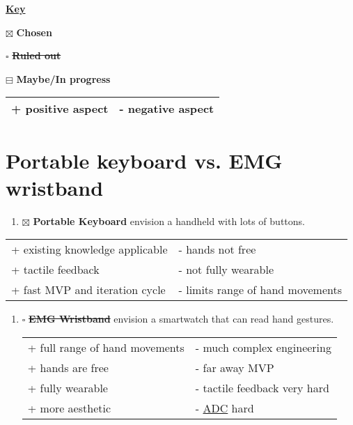\documentclass[logo,bsc,singlespacing,parskip]{infthesis}
\begin{document}
\begin{mdframed}
\uline{\textbf{Key}}
\begin{center}
\begin{enumerate*}[label={}, itemjoin={\qquad}]
\item[{$\boxtimes$}] \textbf{Chosen}
\item[{$\square$}] \sout{\textbf{Ruled out}}
\item[{$\boxminus$}] \textbf{Maybe/In progress}
\end{enumerate*}
\end{center}

\begin{longtable}{|p{5cm}|p{5cm}|}
\hline
+ positive aspect & - negative aspect\\
\hline
\end{longtable}
\end{mdframed}
\section{Portable keyboard vs. EMG wristband}
\label{sec:orge60957a}
\begin{enumerate}
\item{$\boxtimes$} \textbf{Portable Keyboard} envision a handheld with lots of buttons.
\end{enumerate}
\begin{longtable}{|p{6.25cm}|p{6.25cm}|}
\hline
+ existing knowledge applicable & - hands not free\\
+ tactile feedback & - not fully wearable\\
+ fast MVP and iteration cycle & - limits range of hand movements\\
\hline
\end{longtable}
\begin{enumerate}
\item{$\square$} \sout{\textbf{EMG Wristband}} envision a smartwatch that can read hand gestures.
\begin{longtable}{|p{6.25cm}|p{6.25cm}|}
\hline
+ full range of hand movements & - much complex engineering\\
+ hands are free & - far away MVP\\
+ fully wearable & - tactile feedback very hard\\
+ more aesthetic & - \hyperref[org146c745]{ADC} hard\\
\hline
\end{longtable}
\end{enumerate}
\end{document}
